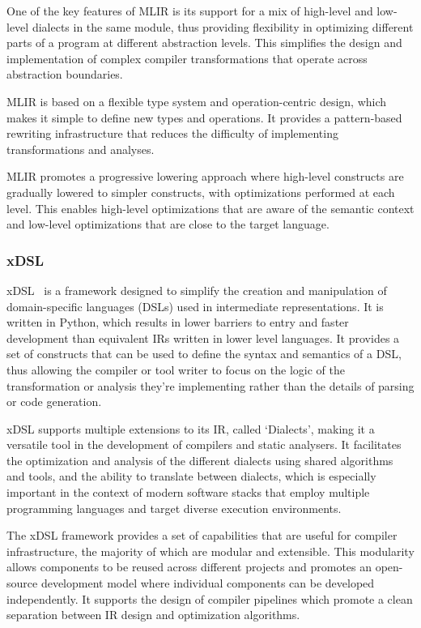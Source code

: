 One of the key features of MLIR is its support for a mix of high-level and low-level dialects in the same module, thus providing flexibility in optimizing different parts of a program at different abstraction levels. This simplifies the design and implementation of complex compiler transformations that operate across abstraction boundaries.

MLIR is based on a flexible type system and operation-centric design, which makes it simple to define new types and operations. It provides a pattern-based rewriting infrastructure that reduces the difficulty of implementing transformations and analyses.

MLIR promotes a progressive lowering approach where high-level constructs are gradually lowered to simpler constructs, with optimizations performed at each level. This enables high-level optimizations that are aware of the semantic context and low-level optimizations that are close to the target language.

\subsubsection{xDSL}
xDSL \cite{xdsl-home} is a framework designed to simplify the creation and manipulation of domain-specific languages (DSLs) used in intermediate representations. It is written in Python, which results in lower barriers to entry and faster development than equivalent IRs written in lower level languages. It provides a set of constructs that can be used to define the syntax and semantics of a DSL, thus allowing the compiler or tool writer to focus on the logic of the transformation or analysis they're implementing rather than the details of parsing or code generation.

xDSL supports multiple extensions to its IR, called `Dialects', making it a versatile tool in the development of compilers and static analysers. It facilitates the optimization and analysis of the different dialects using shared algorithms and tools, and the ability to translate between dialects, which is especially important in the context of modern software stacks that employ multiple programming languages and target diverse execution environments.

The xDSL framework provides a set of capabilities that are useful for compiler infrastructure, the majority of which are modular and extensible. This modularity allows components to be reused across different projects and promotes an open-source development model where individual components can be developed independently. It supports the design of compiler pipelines which promote a clean separation between IR design and optimization algorithms.
